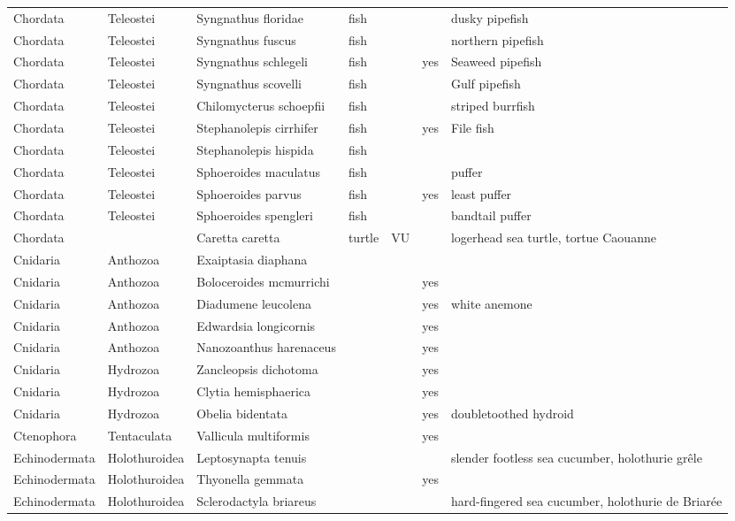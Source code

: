 \begin{longtable}{lllllll}
  Chordata & Teleostei & Syngnathus floridae & fish &  &  & dusky pipefish \\ 
  Chordata & Teleostei & Syngnathus fuscus & fish &  &  & northern pipefish \\ 
  Chordata & Teleostei & Syngnathus schlegeli & fish &  & yes & Seaweed pipefish \\ 
  Chordata & Teleostei & Syngnathus scovelli & fish &  &  & Gulf pipefish \\ 
  Chordata & Teleostei & Chilomycterus schoepfii & fish &  &  & striped burrfish \\ 
  Chordata & Teleostei & Stephanolepis cirrhifer & fish &  & yes & File fish \\ 
  Chordata & Teleostei & Stephanolepis hispida & fish &  &  &  \\ 
  Chordata & Teleostei & Sphoeroides maculatus & fish &  &  & puffer \\ 
  Chordata & Teleostei & Sphoeroides parvus & fish &  & yes & least puffer \\ 
  Chordata & Teleostei & Sphoeroides spengleri & fish &  &  & bandtail puffer \\ 
  Chordata &  & Caretta caretta & turtle & VU &  & logerhead sea turtle, tortue Caouanne \\ 
  Cnidaria & Anthozoa & Exaiptasia diaphana &  &  &  &  \\ 
  Cnidaria & Anthozoa & Boloceroides mcmurrichi &  &  & yes &  \\ 
  Cnidaria & Anthozoa & Diadumene leucolena &  &  & yes & white anemone \\ 
  Cnidaria & Anthozoa & Edwardsia longicornis &  &  & yes &  \\ 
  Cnidaria & Anthozoa & Nanozoanthus harenaceus &  &  & yes &  \\ 
  Cnidaria & Hydrozoa & Zancleopsis dichotoma &  &  & yes &  \\ 
  Cnidaria & Hydrozoa & Clytia hemisphaerica &  &  & yes &  \\ 
  Cnidaria & Hydrozoa & Obelia bidentata &  &  & yes & doubletoothed hydroid \\ 
  Ctenophora & Tentaculata & Vallicula multiformis &  &  & yes &  \\ 
  Echinodermata & Holothuroidea & Leptosynapta tenuis &  &  &  & slender footless sea cucumber, holothurie grêle \\ 
  Echinodermata & Holothuroidea & Thyonella gemmata &  &  & yes &  \\ 
  Echinodermata & Holothuroidea & Sclerodactyla briareus &  &  &  & hard-fingered sea cucumber, holothurie de Briarée \\ 

\end{longtable}
